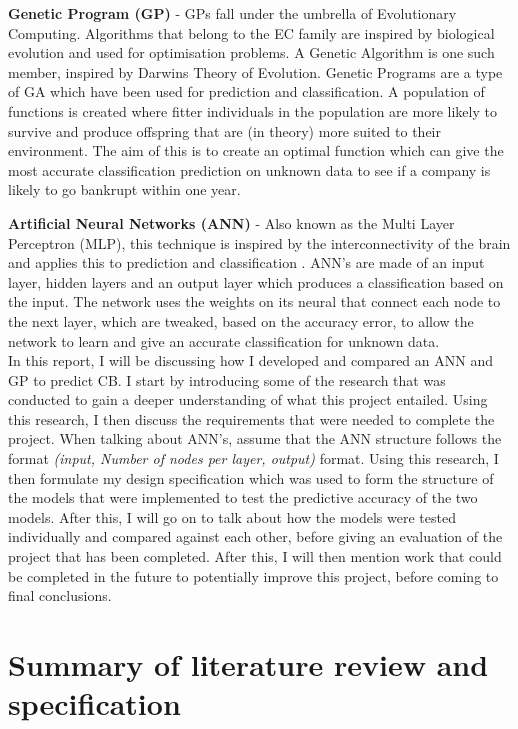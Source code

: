 \documentclass[11pt]{article}
\begin{document}
\textbf{Genetic Program (GP)} - GPs fall under the umbrella of Evolutionary Computing. Algorithms that belong to the EC family are inspired by biological evolution and used for optimisation problems. A Genetic Algorithm is one such member, inspired by Darwins Theory of Evolution. Genetic Programs are a type of GA which have been used for prediction and classification. A population of functions is created where fitter individuals in the population are more likely to survive and produce offspring that are (in theory) more suited to their environment. The aim of this is to create an optimal function which can give the most accurate classification prediction on unknown data to see if a company is likely to go bankrupt within one year. 

\textbf{Artificial Neural Networks (ANN)} - Also known as the Multi Layer Perceptron (MLP),  this technique is inspired by the interconnectivity of the brain and applies this to prediction and classification \cite{?}. ANN's are made of an input layer, hidden layers and an output layer which produces a classification based on the input. The network uses the weights on its neural that connect each node to the next layer, which are tweaked, based on the accuracy error, to allow the network to learn and give an accurate classification for unknown data. 
\\

In this report, I will be discussing how I developed and compared an ANN and GP to predict CB.  I start by introducing some of the research that was conducted to gain a deeper understanding of what this project entailed. Using this research, I then discuss the requirements that were needed to complete the project. When talking about ANN's, assume that the ANN structure follows the format \textit{(input, Number of nodes per layer, output)} format. Using this research, I then formulate my design specification which was used to form the structure of the models that were implemented to test the predictive accuracy of the two models. After this, I will go on to talk about how the models were tested individually and compared against each other, before giving an evaluation of the project that has been completed. After this, I will then mention work that could be completed in the future to potentially improve this project, before coming to final conclusions. 
\section{Summary of literature review and specification}\label{sec:spec}
\end{document}
